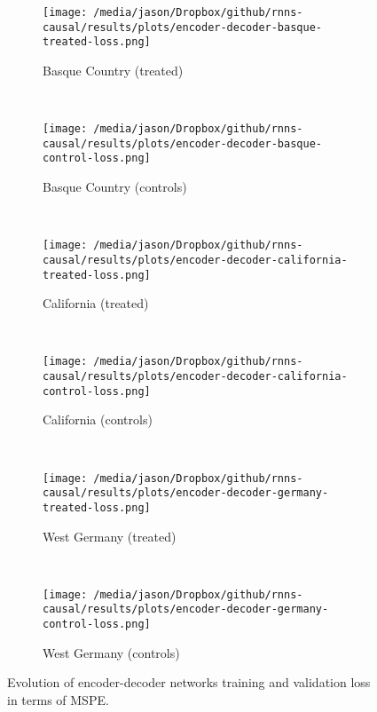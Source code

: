\documentclass[12pt]{article}
\begin{document}
\begin{figure*}[htbp]
    \centering
    \begin{subfigure}[t]{0.4\textwidth}
        \centering
        \texttt{[image: /media/jason/Dropbox/github/rnns-causal/results/plots/encoder-decoder-basque-treated-loss.png]}
        \caption{Basque Country (treated) \label{encoder-decoder-loss-basque-treated}} 
    \end{subfigure}
    ~ 
        \begin{subfigure}[t]{0.4\textwidth}
        \centering
        \texttt{[image: /media/jason/Dropbox/github/rnns-causal/results/plots/encoder-decoder-basque-control-loss.png]}
        \caption{Basque Country (controls)}
    \end{subfigure}
    ~ %
    \begin{subfigure}[t]{0.4\textwidth}
        \centering
        \texttt{[image: /media/jason/Dropbox/github/rnns-causal/results/plots/encoder-decoder-california-treated-loss.png]}
        \caption{California (treated)}
    \end{subfigure}
            ~ 
    \begin{subfigure}[t]{0.4\textwidth}
        \centering
        \texttt{[image: /media/jason/Dropbox/github/rnns-causal/results/plots/encoder-decoder-california-control-loss.png]}
        \caption{California (controls)}
    \end{subfigure}
            ~ %
    \begin{subfigure}[t]{0.4\textwidth}
        \centering
        \texttt{[image: /media/jason/Dropbox/github/rnns-causal/results/plots/encoder-decoder-germany-treated-loss.png]}
        \caption{West Germany (treated)}
    \end{subfigure}
            ~ 
    \begin{subfigure}[t]{0.4\textwidth}
        \centering
        \texttt{[image: /media/jason/Dropbox/github/rnns-causal/results/plots/encoder-decoder-germany-control-loss.png]}
        \caption{West Germany (controls)}
    \end{subfigure}
\caption{Evolution of encoder-decoder networks training and validation loss in terms of MSPE. \label{encoder-decoder-loss-scm}} 
\end{figure*}
\end{document}
